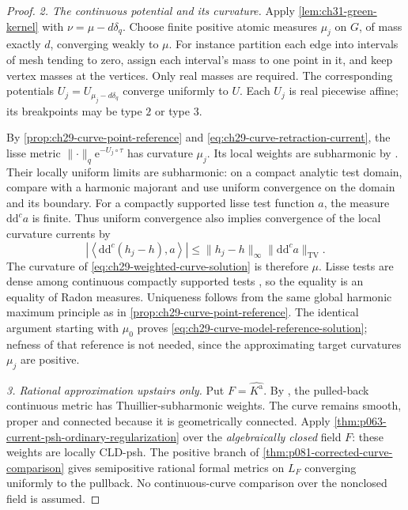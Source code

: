\begin{proof}
\emph{2. The continuous potential and its curvature.}
Apply \cref{lem:ch31-green-kernel} with
\(\nu=\mu-d\delta_q\).  Choose finite positive atomic measures
\(\mu_j\) on \(G\), of mass exactly \(d\), converging weakly to
\(\mu\).  For instance partition each edge into intervals of mesh
tending to zero, assign each interval's mass to one point in it, and
keep vertex masses at the vertices.  Only real masses are required.
The corresponding potentials \(U_j=U_{\mu_j-d\delta_q}\) converge
uniformly to \(U\).  Each \(U_j\) is real piecewise affine; its
breakpoints may be type \(2\) or type \(3\).

By \cref{prop:ch29-curve-point-reference} and \eqref{eq:ch29-curve-retraction-current},
the lisse metric
\(\lVert\cdot\rVert_q\mathrm e^{-U_j\circ\tau}\) has curvature
\(\mu_j\).  Its local weights are subharmonic by
\cite[Theorem~3.4.12(ii)]{Thu05}.  Their locally uniform limits are
subharmonic: on a compact analytic test domain, compare with a harmonic
majorant and use uniform convergence on the domain and its boundary.
For a compactly supported lisse test function \(a\), the measure
\(\mathrm d\mathrm d^ca\) is finite.  Thus uniform convergence
also implies convergence of the local curvature currents by
\[
 \left|\left\langle\mathrm d\mathrm d^c(h_j-h),a\right\rangle\right|
       \leq\lVert h_j-h\rVert_\infty
                         \lVert\mathrm d\mathrm d^ca\rVert_{\mathrm{TV}}.
\]
The curvature of \eqref{eq:ch29-weighted-curve-solution} is therefore
\(\mu\).  Lisse tests are dense among continuous compactly supported
tests \cite[Proposition~3.2.7]{Thu05}, so the equality is an equality
of Radon measures.  Uniqueness follows from the same global harmonic
maximum principle as in \cref{prop:ch29-curve-point-reference}.
The identical argument starting with \(\mu_0\) proves
\eqref{eq:ch29-curve-model-reference-solution}; nefness of that
reference is not needed, since the approximating target curvatures
\(\mu_j\) are positive.

\emph{3. Rational approximation upstairs only.}
Put \(F=\widehat{K^{\mathrm a}}\).  By
\cite[Corollary~3.4.5]{Thu05}, the pulled-back continuous metric has
Thuillier-subharmonic weights.  The curve remains smooth, proper and
connected because it is geometrically connected.  Apply \cref{thm:p063-current-psh-ordinary-regularization} over the
\emph{algebraically closed} field \(F\): these weights are locally
CLD-psh.  The positive branch of \cref{thm:p081-corrected-curve-comparison} gives semipositive rational
formal metrics on \(L_F\) converging uniformly to the pullback.
No continuous-curve comparison over the nonclosed field is assumed.


\end{proof}
